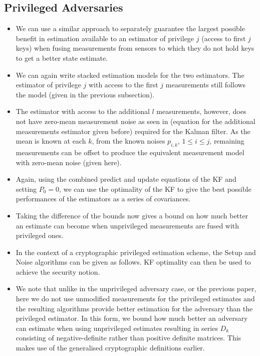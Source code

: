 \documentclass[conference]{IEEEtran}
\begin{document}
\subsection{Privileged Adversaries}\label{subsec:crypto_privileged}
\begin{itemize}
  \item We can use a similar approach to separately guarantee the largest possible benefit in estimation available to an estimator of privilege $j$ (access to first $j$ keys) when fusing measurements from sensors to which they do not hold keys to get a better state estimate.
  \item We can again write stacked estimation models for the two estimators. The estimator of privilege $j$ with access to the first $j$ measurements still follows the model (given in the previous subsection).
  \item The estimator with access to the additional $l$ measurements, however, does not have zero-mean measurement noise as seen in (equation for the additional measurements estimator given before) required for the Kalman filter. As the mean is known at each $k$, from the known noises $p_{i,k}$, $1\leq i\leq j$, remaining measurements can be offset to produce the equivalent measurement model with zero-mean noise (given here).
  \item Again, using the combined predict and update equations of the KF and setting $P_0=0$, we can use the optimality of the KF to give the best possible performances of the estimators as a series of covariances.
  \item Taking the difference of the bounds now gives a bound on how much better an estimate can become when unprivileged measurements are fused with privileged ones.
  \item In the context of a cryptographic privileged estimation scheme, the Setup and Noise algorithms can be given as follows. KF optimality can then be used to achieve the security notion.
  \item We note that unlike in the unprivileged adversary case, or the previous paper, here we do not use unmodified measurements for the privileged estimates and the resulting algorithms provide better estimation for the adversary than the privileged estimator. In this form, we bound how much better an adversary can estimate when using unprivileged estimates resulting in series $D_k$ consisting of negative-definite rather than positive definite matrices. This makes use of the generalised cryptographic definitions earlier.
\end{itemize}
\end{document}

